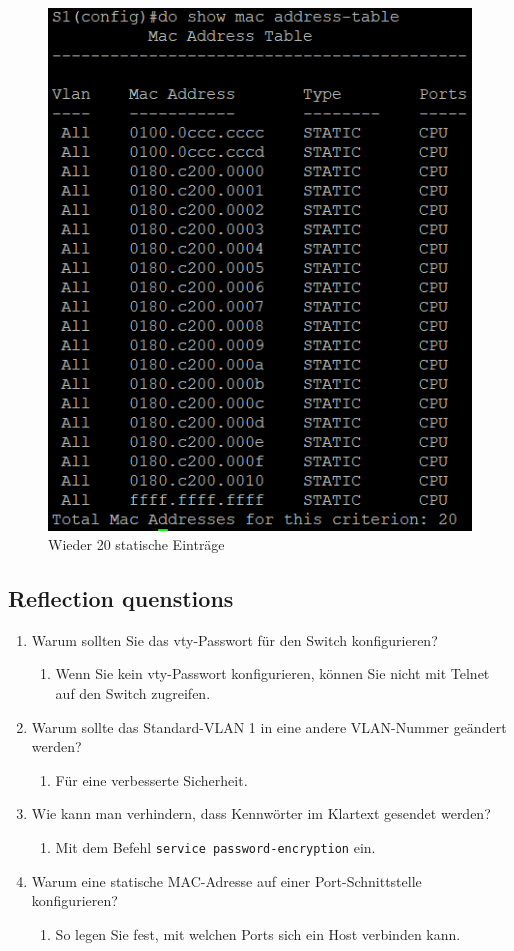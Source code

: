 \documentclass[a4paper]{article}
\newcommand{\abc}{\hfill \break}
\begin{document}
\begin{figure}[h]
	\centering
	\includegraphics[scale=0.4]{images/macddr3.png}
	\caption{Wieder 20 statische Einträge}
\end{figure}\abc


\subsection{Reflection quenstions}
\begin{enumerate}
	\item Warum sollten Sie das vty-Passwort für den Switch konfigurieren?
\begin{enumerate}
	\item Wenn Sie kein vty-Passwort konfigurieren, können Sie nicht mit Telnet auf den Switch zugreifen.
\end{enumerate}
\item Warum sollte das Standard-VLAN 1 in eine andere VLAN-Nummer geändert werden?
\begin{enumerate}
	\item Für eine verbesserte Sicherheit.
\end{enumerate}
\item Wie kann man verhindern, dass Kennwörter im Klartext gesendet werden?
\begin{enumerate}
	\item Mit dem Befehl \texttt{service password-encryption} ein.
\end{enumerate}
\item Warum eine statische MAC-Adresse auf einer Port-Schnittstelle konfigurieren?
\begin{enumerate}
	\item So legen Sie fest, mit welchen Ports sich ein Host verbinden kann.
\end{enumerate}
\end{enumerate}
\end{document}
